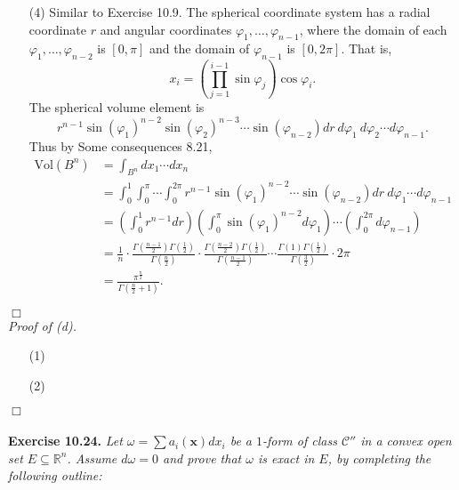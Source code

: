 \documentclass{article}
\begin{document}
\begin{enumerate}
\item[(4)]
  Similar to Exercise 10.9.
  The spherical coordinate system has a radial coordinate $r$ and
  angular coordinates $\varphi_1, \ldots, \varphi_{n-1}$,
  where the domain of each $\varphi_1, \ldots, \varphi_{n-2}$ is $[0,\pi]$
  and the domain of $\varphi_{n-1}$ is $[0,2\pi]$.
  That is,
  \[
    x_i = \left( \prod_{j=1}^{i-1} \sin\varphi_j \right) \cos\varphi_i.
  \]
  The spherical volume element is
  \[
    r^{n-1} \sin(\varphi_1)^{n-2} \sin(\varphi_2)^{n-3} \cdots \sin(\varphi_{n-2})
    dr \: d\varphi_1 \: d\varphi_2 \cdots d\varphi_{n-1}.
  \]
  Thus by Some consequences 8.21,
  \begin{align*}
    \mathrm{Vol}(B^n)
    &= \int_{B^{n}} dx_1 \cdots dx_n \\
    &= \int_{0}^{1} \int_{0}^{\pi} \cdots \int_{0}^{2\pi}
      r^{n-1} \sin(\varphi_1)^{n-2} \cdots \sin(\varphi_{n-2})
      dr \: d\varphi_1 \cdots d\varphi_{n-1} \\
    &= \left( \int_{0}^{1} r^{n-1} dr \right)
      \left(\int_{0}^{\pi} \sin(\varphi_1)^{n-2} d\varphi_1 \right)
      \cdots
      \left(\int_{0}^{2\pi} d\varphi_{n-1} \right) \\
    &= \frac{1}{n}
      \cdot \frac{\Gamma(\frac{n-1}{2})\Gamma(\frac{1}{2})}{\Gamma(\frac{n}{2})}
      \cdot \frac{\Gamma(\frac{n-2}{2})\Gamma(\frac{1}{2})}{\Gamma(\frac{n-1}{2})}
      \cdots
      \frac{\Gamma(1)\Gamma(\frac{1}{2})}{\Gamma(\frac{3}{2})} \cdot 2\pi \\
    &= \frac{\pi^{\frac{n}{2}}}{\Gamma\left(\frac{n}{2}+1\right)}.
  \end{align*}
\end{enumerate}
$\Box$ \\



\emph{Proof of (d).}
\begin{enumerate}
\item[(1)]
\item[(2)]

\end{enumerate}
$\Box$ \\\\






\textbf{Exercise 10.24.}
\emph{Let $\omega = \sum a_i(\mathbf{x}) dx_i$ be a $1$-form of class $\mathscr{C}''$
in a convex open set $E \subseteq \mathbb{R}^n$.
Assume $d\omega = 0$ and prove that $\omega$ is exact in $E$,
by completing the following outline:} \\
\end{document}
